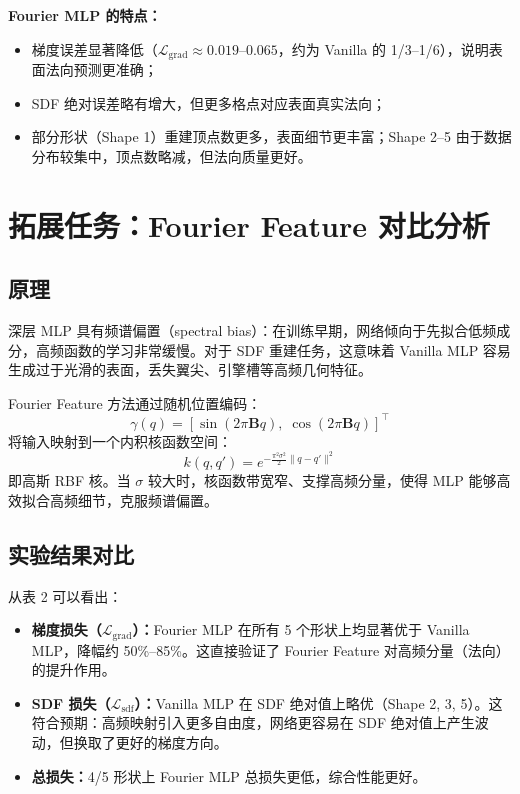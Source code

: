 \documentclass[12pt, a4paper]{article}
\begin{document}
\textbf{Fourier MLP 的特点：}
\begin{itemize}
  \item 梯度误差显著降低（$\mathcal{L}_\text{grad} \approx 0.019$--$0.065$，约为 Vanilla 的 1/3--1/6），说明表面法向预测更准确；
  \item SDF 绝对误差略有增大，但更多格点对应表面真实法向；
  \item 部分形状（Shape 1）重建顶点数更多，表面细节更丰富；Shape 2--5 由于数据分布较集中，顶点数略减，但法向质量更好。
\end{itemize}

\section{拓展任务：Fourier Feature 对比分析}

\subsection{原理}

深层 MLP 具有频谱偏置（spectral bias）\cite{rahaman2019spectral}：在训练早期，网络倾向于先拟合低频成分，高频函数的学习非常缓慢。对于 SDF 重建任务，这意味着 Vanilla MLP 容易生成过于光滑的表面，丢失翼尖、引擎槽等高频几何特征。

Fourier Feature 方法通过随机位置编码：
\begin{equation}
  \gamma(q) = \left[\sin(2\pi \mathbf{B} q),\; \cos(2\pi \mathbf{B} q)\right]^\top
\end{equation}
将输入映射到一个内积核函数空间：
\begin{equation}
  k(q, q') = e^{-\frac{\pi^2 \sigma^2}{2}\|q-q'\|^2}
\end{equation}
即高斯 RBF 核。当 $\sigma$ 较大时，核函数带宽窄、支撑高频分量，使得 MLP 能够高效拟合高频细节，克服频谱偏置。

\subsection{实验结果对比}

从表 2 可以看出：

\begin{itemize}
  \item \textbf{梯度损失（$\mathcal{L}_\text{grad}$）：}Fourier MLP 在所有 5 个形状上均显著优于 Vanilla MLP，降幅约 50\%--85\%。这直接验证了 Fourier Feature 对高频分量（法向）的提升作用。

  \item \textbf{SDF 损失（$\mathcal{L}_\text{sdf}$）：}Vanilla MLP 在 SDF 绝对值上略优（Shape 2, 3, 5）。这符合预期：高频映射引入更多自由度，网络更容易在 SDF 绝对值上产生波动，但换取了更好的梯度方向。

  \item \textbf{总损失：}4/5 形状上 Fourier MLP 总损失更低，综合性能更好。
\end{itemize}
\end{document}
